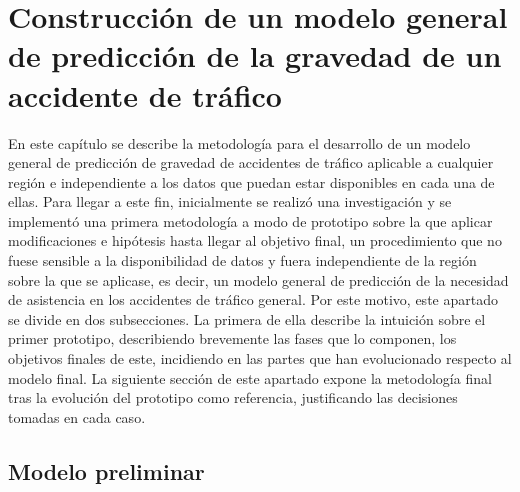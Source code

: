 

\chapter{Construcción de un modelo general de predicción de la gravedad de un accidente de tráfico}

En este capítulo se describe la metodología para el desarrollo de un modelo general de predicción de gravedad de accidentes de tráfico aplicable a cualquier región e independiente a los datos que puedan estar disponibles en cada una de ellas. Para llegar a este fin, inicialmente se realizó una investigación y se implementó una primera metodología a modo de prototipo sobre la que aplicar modificaciones e hipótesis hasta llegar al objetivo final, un procedimiento que no fuese sensible a la disponibilidad de datos y fuera independiente de la región sobre la que se aplicase, es decir, un modelo general de predicción de la necesidad de asistencia en los accidentes de tráfico general. Por este motivo, este apartado se divide en dos subsecciones. La primera de ella describe la intuición sobre el primer prototipo, describiendo brevemente las fases que lo componen, los objetivos finales de este, incidiendo en las partes que han evolucionado respecto al modelo final. La siguiente sección de este apartado expone la metodología final tras la evolución del prototipo como referencia, justificando las decisiones tomadas en cada caso.


\section{Modelo preliminar}
\label{METODOLOGIA_MODELO_PRELIMINAR}



